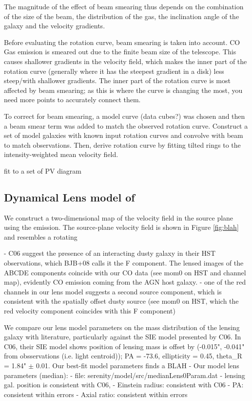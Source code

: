 \documentclass[]{emulateapj}
\begin{document}
The magnitude of the
effect of beam smearing thus depends on the combination of
the size of the beam, the distribution of the gas, the inclination
angle of the galaxy and the velocity gradients.

Before evaluating the rotation curve, beam smearing is taken into account. CO Gas emission is smeared out due to the finite 
beam size of the telescope. This causes shallower gradients in the velocity field, which makes the inner part of the rotation 
curve (generally where it has the steepest gradient in a disk) less steep/with shallower gradients.  
The inner part of the rotation curve is most affected by beam smearing; as this is 
where the curve is changing the most, you need more points to accurately connect them. 

 To correct for beam smearing, a model curve (data cubes?) was chosen and then a beam smear term was added to match the observed 
rotation curve. Construct a set of model galaxies with known input rotation curves and convolve with beam to match 
observations. Then, derive rotation curve by fitting tilted rings to the intensity-weighted mean velocity field.

fit to a set of PV diagram

\subsection{Dynamical Lens model of }
We construct a two-dimensional map of the velocity field in the source plane using the  emission. 
The source-plane velocity field is shown in Figure \ref{fig:blah} and resembles a rotating 

- C06 suggest the presence of an interacting dusty galaxy in their HST
observations, which BJB+08 calls it the F component. The lensed images of the
ABCDE
components coincide with our CO data (see mom0 on HST and channel map),
evidently CO emission coming from the AGN host galaxy.
- one of the red channels in our lens model suggests a second source component,
which is consistent with the spatially offset dusty source (see mom0 on HST,
which
the red velocity component coincides with this F component)

We compare our lens model parameters on the mass distribution of the lensing
galaxy with literature, particularly against the SIE model presented by C06.
In C06, their SIE model shows position of lensing mass is offset by (-0.015",
-0.041" from obsservations (i.e. light centroid)); PA = -73.6, ellipticity = 0.45,
theta\_R = 1.84" $\pm$ 0.01.
Our best-fit model parameters finds a BLAH
	- Our model lens parameters (median):
		- file: serenity/model/src/medianLens0Param.dat
		- lensing gal. position is consistent with C06,
		- Einstein radius: consistent with C06
		- PA: consistent within errors
		- Axial ratio: consistent within errors
\end{document}
